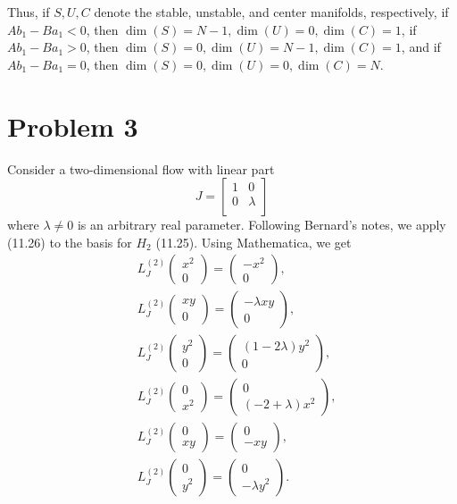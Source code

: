 \documentclass{article}
\begin{document}
Thus, if $S,U,C$ denote the stable, unstable, and center manifolds, respectively, if $Ab_1-Ba_1<0$, then $\dim(S)=N-1,\dim(U)=0,\dim(C)=1$, if $Ab_1-Ba_1>0$, then $\dim(S)=0,\dim(U)=N-1,\dim(C)=1$, and if $Ab_1-Ba_1=0$, then $\dim(S)=0,\dim(U)=0,\dim(C)=N$.

\section{Problem 3}
Consider a two-dimensional flow with linear part $$
J=
\left[ {\begin{array}{cc}
		1 & 0 \\
		0 & \lambda \\
\end{array} } \right] $$ where $\lambda \neq 0$ is an arbitrary real parameter. Following Bernard's notes, we apply (11.26) to the basis for $H_2$ (11.25). Using Mathematica, we get
\begin{align*}
&L^{(2)}_J\begin{pmatrix}
	x^2\\0
\end{pmatrix}=\begin{pmatrix}
-x^2\\0
\end{pmatrix},\\
&L^{(2)}_J\begin{pmatrix}
	xy\\0
\end{pmatrix}=\begin{pmatrix}
-\lambda xy\\0
\end{pmatrix},\\
&L^{(2)}_J\begin{pmatrix}
	y^2\\0
\end{pmatrix}=\begin{pmatrix}
	(1-2\lambda)y^2\\0
\end{pmatrix},\\
&L^{(2)}_J\begin{pmatrix}
	0\\x^2
\end{pmatrix}=\begin{pmatrix}
	0\\(-2+\lambda)x^2
\end{pmatrix},\\
&L^{(2)}_J\begin{pmatrix}
	0\\xy
\end{pmatrix}=\begin{pmatrix}
	0\\-xy
\end{pmatrix},\\
&L^{(2)}_J\begin{pmatrix}
	0\\y^2
\end{pmatrix}=\begin{pmatrix}
	0\\-\lambda y^2
\end{pmatrix}.\\
\end{align*}
\end{document}
